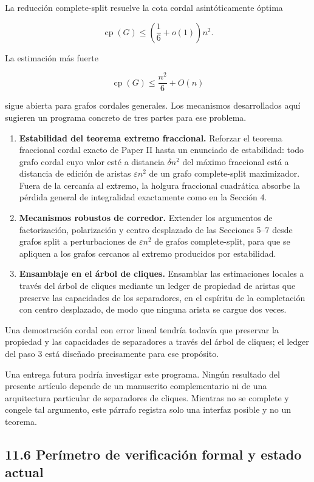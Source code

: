 \documentclass[
  spanish,
  11pt,
  a4paper,
]{article}
\begin{document}
La reducción complete-split resuelve la cota cordal asintóticamente óptima

\[
\operatorname{cp}(G)
\le
\left(\frac16+o(1)\right)n^2.
\]

La estimación más fuerte

\[
\operatorname{cp}(G)
\le
\frac{n^2}{6}+O(n)
\]

sigue abierta para grafos cordales generales. Los mecanismos desarrollados aquí sugieren un programa concreto de tres partes para ese problema.

\begin{enumerate}
\def\labelenumi{\arabic{enumi}.}
\item
  \textbf{Estabilidad del teorema extremo fraccional.} Reforzar el teorema fraccional cordal exacto de Paper II hasta un enunciado de estabilidad: todo grafo cordal cuyo valor esté a distancia \(\delta n^2\) del máximo fraccional está a distancia de edición de aristas \(\varepsilon n^2\) de un grafo complete-split maximizador. Fuera de la cercanía al extremo, la holgura fraccional cuadrática absorbe la pérdida general de integralidad exactamente como en la Sección 4.
\item
  \textbf{Mecanismos robustos de corredor.} Extender los argumentos de factorización, polarización y centro desplazado de las Secciones 5--7 desde grafos split a perturbaciones de \(\varepsilon n^2\) de grafos complete-split, para que se apliquen a los grafos cercanos al extremo producidos por estabilidad.
\item
  \textbf{Ensamblaje en el árbol de cliques.} Ensamblar las estimaciones locales a través del árbol de cliques mediante un ledger de propiedad de aristas que preserve las capacidades de los separadores, en el espíritu de la completación con centro desplazado, de modo que ninguna arista se cargue dos veces.
\end{enumerate}

Una demostración cordal con error lineal tendría todavía que preservar la propiedad y las capacidades de separadores a través del árbol de cliques; el ledger del paso 3 está diseñado precisamente para ese propósito.

Una entrega futura podría investigar este programa. Ningún resultado del presente artículo depende de un manuscrito complementario ni de una arquitectura particular de separadores de cliques. Mientras no se complete y congele tal argumento, este párrafo registra solo una interfaz posible y no un teorema.

\subsection{11.6 Perímetro de verificación formal y estado actual}\label{peruxedmetro-de-verificaciuxf3n-formal-y-estado-actual}
\end{document}
